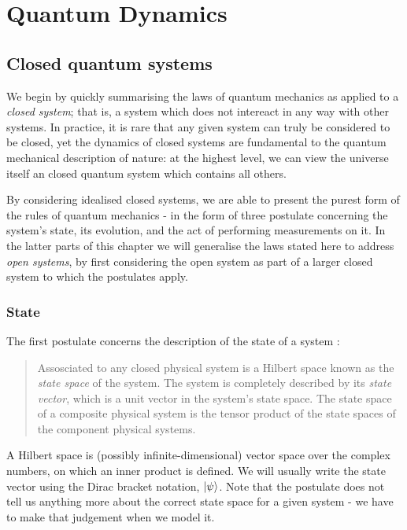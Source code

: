 \chapter{Quantum Dynamics} 
\label{ch:QuantumDynamics}

\section{Closed quantum systems}

We begin by quickly summarising the laws of quantum mechanics as applied to a \textit{closed system}; that is, a system which does not intereact in any way with other systems. In practice, it is rare that any given system can truly be considered to be closed, yet the dynamics of closed systems are fundamental to the quantum mechanical description of nature: at the highest level, we can view the universe itself an closed quantum system which contains all others.

By considering idealised closed systems, we are able to present the purest form of the rules of quantum mechanics - in the form of three postulate concerning the system's state, its evolution, and the act of performing measurements on it. In the latter parts of this chapter we will generalise the laws stated here to address \textit{open systems}, by first considering the open system as part of a larger closed system to which the postulates apply.

\subsection{State}

The first postulate concerns the description of the state of a system \cite{nielsen+chuang}:
\begin{quotation}
  Assosciated to any closed physical system is a Hilbert space known as the \textit{state space} of the system. The system is completely described by its \textit{state vector}, which is a unit vector in the system's state space. The state space of a composite physical system is the tensor product of the state spaces of the component physical systems.
\end{quotation}
A Hilbert space is (possibly infinite-dimensional) vector space over the complex numbers, on which an inner product is defined. We will usually write the state vector using the Dirac bracket notation, $\left\vert\psi\right\rangle$. Note that the postulate does not tell us anything more about the correct state space for a given system - we have to make that judgement when we model it.

